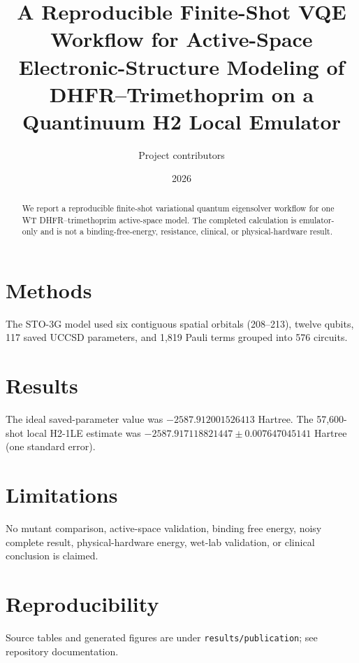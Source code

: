\documentclass[11pt]{article}
\title{A Reproducible Finite-Shot VQE Workflow for Active-Space Electronic-Structure Modeling of DHFR--Trimethoprim on a Quantinuum H2 Local Emulator}
\author{Project contributors}\date{2026}
\begin{document}
\maketitle
\begin{abstract}We report a reproducible finite-shot variational quantum eigensolver workflow for one WT DHFR--trimethoprim active-space model. The completed calculation is emulator-only and is not a binding-free-energy, resistance, clinical, or physical-hardware result.\end{abstract}
\section{Methods}The STO-3G model used six contiguous spatial orbitals (208--213), twelve qubits, 117 saved UCCSD parameters, and 1,819 Pauli terms grouped into 576 circuits.\section{Results}The ideal saved-parameter value was $-2587.912001526413$ Hartree. The 57,600-shot local H2-1LE estimate was $-2587.917118821447\pm0.007647045141$ Hartree (one standard error).\section{Limitations}No mutant comparison, active-space validation, binding free energy, noisy complete result, physical-hardware energy, wet-lab validation, or clinical conclusion is claimed.\section{Reproducibility}Source tables and generated figures are under \texttt{results/publication}; see repository documentation.
\end{document}
